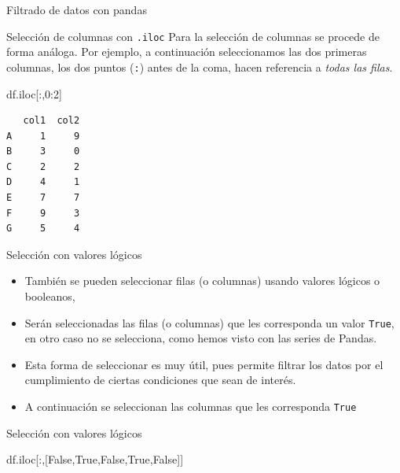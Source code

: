\documentclass[
  ignorenonframetext,
  aspectratio=169,
  spanish,
]{beamer}
\newenvironment{Shaded}{\begin{snugshade}}{\end{snugshade}}
\newcommand{\DecValTok}[1]{\textcolor[rgb]{0.68,0.00,0.00}{#1}}
\newcommand{\NormalTok}[1]{\textcolor[rgb]{0.00,0.23,0.31}{#1}}
\newcommand{\VariableTok}[1]{\textcolor[rgb]{0.07,0.07,0.07}{#1}}
\begin{document}
\begin{frame}[fragile]{Filtrado de datos con pandas}
\begin{block}{Selección de columnas con \texttt{.iloc}}
\label{selecciuxf3n-de-columnas-con-.iloc}
Para la selección de columnas se procede de forma análoga. Por ejemplo,
a continuación seleccionamos las dos primeras columnas, los dos puntos
(\texttt{:}) antes de la coma, hacen referencia a \emph{todas las
filas}.

\begin{Shaded}
\begin{Highlighting}[]
\NormalTok{df.iloc[:,}\DecValTok{0}\NormalTok{:}\DecValTok{2}\NormalTok{]}
\end{Highlighting}
\end{Shaded}

\begin{verbatim}
   col1  col2
A     1     9
B     3     0
C     2     2
D     4     1
E     7     7
F     9     3
G     5     4
\end{verbatim}
\end{block}

\begin{block}{Selección con valores lógicos}
\label{selecciuxf3n-con-valores-luxf3gicos}
\begin{itemize}
\item
  También se pueden seleccionar filas (o columnas) usando valores
  lógicos o booleanos,
\item
  Serán seleccionadas las filas (o columnas) que les corresponda un
  valor \texttt{True}, en otro caso no se selecciona, como hemos visto
  con las series de Pandas.
\item
  Esta forma de seleccionar es muy útil, pues permite filtrar los datos
  por el cumplimiento de ciertas condiciones que sean de interés.
\item
  A continuación se seleccionan las columnas que les corresponda
  \texttt{True}
\end{itemize}
\end{block}

\begin{block}{Selección con valores lógicos}
\label{selecciuxf3n-con-valores-luxf3gicos-1}
\begin{Shaded}
\begin{Highlighting}[]
\NormalTok{df.iloc[:,[}\VariableTok{False}\NormalTok{,}\VariableTok{True}\NormalTok{,}\VariableTok{False}\NormalTok{,}\VariableTok{True}\NormalTok{,}\VariableTok{False}\NormalTok{]]}
\end{Highlighting}
\end{Shaded}


\end{block}
\end{frame}
\end{document}

